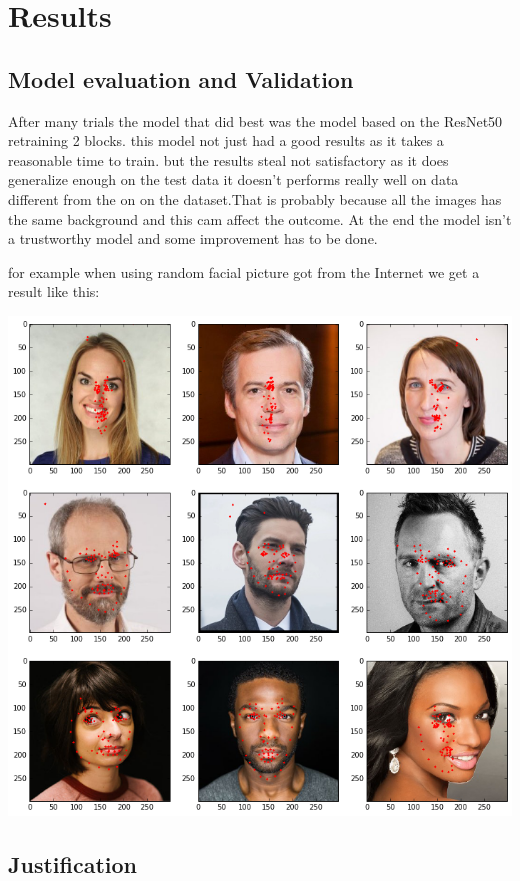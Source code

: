 \documentclass[11pt]{article}
\begin{document}
\section{Results}
\label{sec:orge5d03b4}

\subsection{Model evaluation and Validation}
\label{sec:org0dfd64f}
After many trials the model that did best was the model based on the ResNet50
retraining 2 blocks. this model not just had a good results as it takes a
reasonable time to train. but the results steal not satisfactory as it does
generalize enough on the test data it doesn't performs really well on data
different from the on on the dataset.That is probably because all the images
has the same background and this cam affect the outcome.
At the end the model isn't a trustworthy model and some improvement has to be
done. 

for example when using random facial picture got from the Internet we get a
result like this:

\begin{center}
\includegraphics[width=.9\linewidth]{./images/gene.png}
\end{center}




\subsection{Justification}
\label{sec:orgac2562d}
\end{document}
